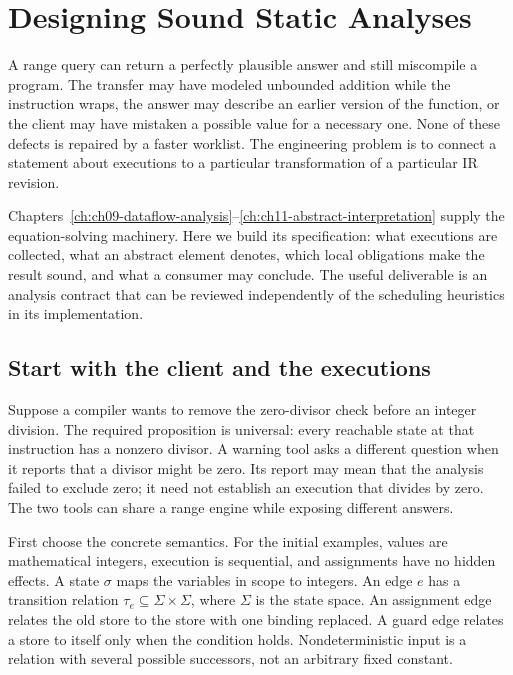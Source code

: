 \chapter{Designing Sound Static Analyses}
\label{ch:designing-sound-analyses}

A range query can return a perfectly plausible answer and still miscompile a program.
The transfer may have modeled unbounded addition while the instruction wraps, the answer may describe an earlier version of the function, or the client may have mistaken a possible value for a necessary one.
None of these defects is repaired by a faster worklist.
The engineering problem is to connect a statement about executions to a particular transformation of a particular IR revision.

Chapters~\ref{ch:ch09-dataflow-analysis}--\ref{ch:ch11-abstract-interpretation} supply the equation-solving machinery.
Here we build its specification: what executions are collected, what an abstract element denotes, which local obligations make the result sound, and what a consumer may conclude.
The useful deliverable is an analysis contract that can be reviewed independently of the scheduling heuristics in its implementation.

\section{Start with the client and the executions}
\label{sec:ch42-client-first}

Suppose a compiler wants to remove the zero-divisor check before an integer division.
The required proposition is universal: every reachable state at that instruction has a nonzero divisor.
A warning tool asks a different question when it reports that a divisor might be zero.
Its report may mean that the analysis failed to exclude zero; it need not establish an execution that divides by zero.
The two tools can share a range engine while exposing different answers.

First choose the concrete semantics.
For the initial examples, values are mathematical integers, execution is sequential, and assignments have no hidden effects.
A state $\sigma$ maps the variables in scope to integers.
An edge $e$ has a transition relation $\tau_e\subseteq\Sigma\times\Sigma$, where $\Sigma$ is the state space.
An assignment edge relates the old store to the store with one binding replaced.
A guard edge relates a store to itself only when the condition holds.
Nondeterministic input is a relation with several possible successors, not an arbitrary fixed constant.

